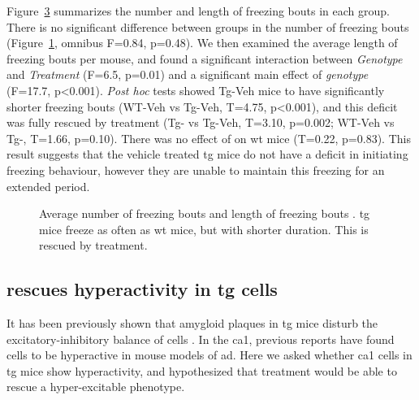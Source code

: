 Figure~\ref{f.ad.freezing_profile} summarizes the number and length of freezing bouts in each group. There is no significant difference between groups in the number of freezing bouts (Figure~\ref{f.ad.freezing_freq}, omnibus F=0.84, p=0.48). We then examined the average length of freezing bouts per mouse, and found a significant interaction between \textit{Genotype} and \textit{Treatment} (F=6.5, p=0.01) and a significant main effect of \textit{genotype} (F=17.7, p<0.001). \textit{Post hoc} tests showed Tg-Veh mice to have significantly shorter freezing bouts (WT-Veh vs Tg-Veh, T=4.75, p<0.001), and this deficit was fully rescued by \tglu{} treatment (Tg-\glu{} vs Tg-Veh, T=3.10, p=0.002; WT-Veh vs Tg-\glu, T=1.66, p=0.10). There was no effect of \tglu{} on \gls{wt} mice (T=0.22, p=0.83). This result suggests that the vehicle treated \gls{tg} mice do not have a deficit in initiating freezing behaviour, however they are unable to maintain this freezing for an extended period. 

\begin{figure}[h]
    \begin{subfigure}[h]{\textwidth}
        
        \caption{\label{f.ad.freezing_freq}}
    \end{subfigure}
    \begin{subfigure}[h]{\textwidth}
        
        \caption{\label{f.ad.freezing_bouts}}
    \end{subfigure}
    \caption[Freezing lengths and number of freezing bouts.]{Average number of freezing bouts  and length of freezing bouts . \Gls{tg} mice freeze as often as \gls{wt} mice, but with shorter duration. This is rescued by \tglu{} treatment. \label{f.ad.freezing_profile}}
\end{figure}


\subsection{\tglu{} rescues hyperactivity in \gls{tg} cells}

It has been previously shown that amygloid plaques in \gls{tg} mice disturb the excitatory-inhibitory balance of cells \citep{palop16}. In the \gls{ca1}, previous reports have found cells to be hyperactive in mouse models of \gls{ad}. Here we asked whether \gls{ca1} cells in \gls{tg} mice show hyperactivity, and hypothesized that \tglu{} treatment would be able to rescue a hyper-excitable phenotype.

